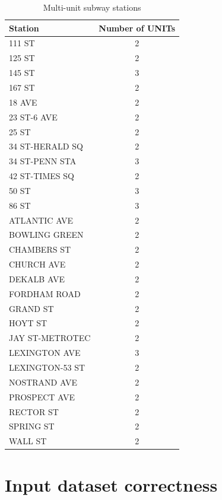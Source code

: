 \documentclass{article}
\begin{document}
\begin{table}[ht]
\centering
\begin{tabular}{l|c}
\hline
Station & Number of UNITs\\
\hline
111 ST &            2\\[3pt]
125 ST  &           2\\[3pt]
145 ST   &          3\\[3pt]
167 ST    &         2\\[3pt]
18 AVE     &        2\\[3pt]
23 ST-6 AVE &       2\\[3pt]
25 ST        &      2\\[3pt]
34 ST-HERALD SQ &   2\\[3pt]
34 ST-PENN STA  &   3\\[3pt]
42 ST-TIMES SQ  &   2\\[3pt]
50 ST           &   3\\[3pt]
86 ST           &   3\\[3pt]
ATLANTIC AVE    &   2\\[3pt]
BOWLING GREEN   &   2\\[3pt]
CHAMBERS ST     &   2\\[3pt]
CHURCH AVE      &   2\\[3pt]
DEKALB AVE      &   2\\[3pt]
FORDHAM ROAD    &   2\\[3pt]
GRAND ST        &   2\\[3pt]
HOYT ST         &   2\\[3pt]
JAY ST-METROTEC &   2\\[3pt]
LEXINGTON AVE   &   3\\[3pt]
LEXINGTON-53 ST &   2\\[3pt]
NOSTRAND AVE    &   2\\[3pt]
PROSPECT AVE    &   2\\[3pt]
RECTOR ST       &   2\\[3pt]
SPRING ST       &   2\\[3pt]
WALL ST         &   2\\
\hline
\end{tabular}
\caption{Multi-unit subway stations}
\label{tab:multi-unit-stations}
\end{table}


\section {Input dataset correctness}
\end{document}
